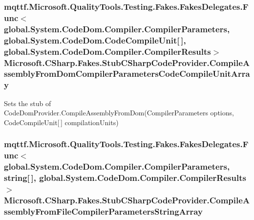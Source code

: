 \hypertarget{class_microsoft_1_1_c_sharp_1_1_fakes_1_1_stub_c_sharp_code_provider_a4ddfa86fe5b27b554cf9392bbc4b61b2}{
\subsubsection[{Compile\-Assembly\-From\-Dom\-Compiler\-Parameters\-Code\-Compile\-Unit\-Array}]{\setlength{\rightskip}{0pt plus 5cm}mqttf.\-Microsoft.\-Quality\-Tools.\-Testing.\-Fakes.\-Fakes\-Delegates.\-Func$<$global.\-System.\-Code\-Dom.\-Compiler.\-Compiler\-Parameters, global.\-System.\-Code\-Dom.\-Code\-Compile\-Unit\mbox{[}$\,$\mbox{]}, global.\-System.\-Code\-Dom.\-Compiler.\-Compiler\-Results$>$ Microsoft.\-C\-Sharp.\-Fakes.\-Stub\-C\-Sharp\-Code\-Provider.\-Compile\-Assembly\-From\-Dom\-Compiler\-Parameters\-Code\-Compile\-Unit\-Array}}\label{class_microsoft_1_1_c_sharp_1_1_fakes_1_1_stub_c_sharp_code_provider_a4ddfa86fe5b27b554cf9392bbc4b61b2}


Sets the stub of Code\-Dom\-Provider.\-Compile\-Assembly\-From\-Dom(\-Compiler\-Parameters options, Code\-Compile\-Unit\mbox{[}$\,$\mbox{]} compilation\-Units)

\hypertarget{class_microsoft_1_1_c_sharp_1_1_fakes_1_1_stub_c_sharp_code_provider_a339771aa280e2f6d44623adbdd3486ac}{
\subsubsection[{Compile\-Assembly\-From\-File\-Compiler\-Parameters\-String\-Array}]{\setlength{\rightskip}{0pt plus 5cm}mqttf.\-Microsoft.\-Quality\-Tools.\-Testing.\-Fakes.\-Fakes\-Delegates.\-Func$<$global.\-System.\-Code\-Dom.\-Compiler.\-Compiler\-Parameters, string\mbox{[}$\,$\mbox{]}, global.\-System.\-Code\-Dom.\-Compiler.\-Compiler\-Results$>$ Microsoft.\-C\-Sharp.\-Fakes.\-Stub\-C\-Sharp\-Code\-Provider.\-Compile\-Assembly\-From\-File\-Compiler\-Parameters\-String\-Array}}\label{class_microsoft_1_1_c_sharp_1_1_fakes_1_1_stub_c_sharp_code_provider_a339771aa280e2f6d44623adbdd3486ac}


